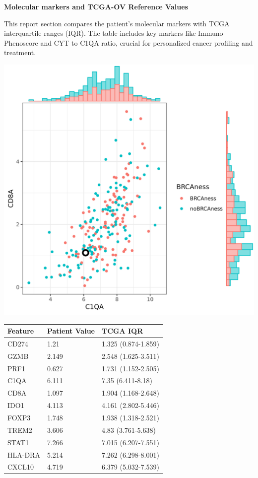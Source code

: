 \documentclass[
]{article}
\begin{document}
\textbf{Molecular markers and TCGA-OV Reference Values}

This report section compares the patient's molecular markers with TCGA
interquartile ranges (IQR). The table includes key markers like Immuno
Phenoscore and CYT to C1QA ratio, crucial for personalized cancer
profiling and treatment.

\begin{multicols}{2}

\includegraphics{./p2.jpeg}

\columnbreak

\begin{tabular}{lll}
\hline
Feature & Patient Value & TCGA IQR \\
\hline
CD274 & 1.21 & 1.325 (0.874-1.859) \\
GZMB & 2.149 & 2.548 (1.625-3.511) \\
PRF1 & 0.627 & 1.731 (1.152-2.505) \\
C1QA & 6.111 & 7.35 (6.411-8.18) \\
CD8A & 1.097 & 1.904 (1.168-2.648) \\
IDO1 & 4.113 & 4.161 (2.802-5.446) \\
FOXP3 & 1.748 & 1.938 (1.318-2.521) \\
TREM2 & 3.606 & 4.83 (3.761-5.638) \\
STAT1 & 7.266 & 7.015 (6.207-7.551) \\
HLA-DRA & 5.214 & 7.262 (6.298-8.001) \\
CXCL10 & 4.719 & 6.379 (5.032-7.539) \\
\hline
\end{tabular}

\end{multicols}
\end{document}
